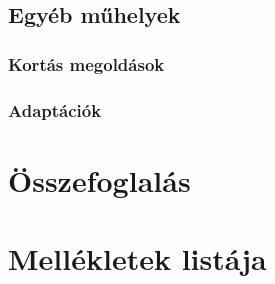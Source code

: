 \documentclass[fontsize=12pt, appendixprefix=true]{scrreprt}
\begin{document}
\section{Egyéb műhelyek}
\subsection{Kortás megoldások}
\subsection{Adaptációk}

\chapter{Összefoglalás} 


\printbibliography
\renewcommand{\appendixname}{Függelék}  %
\appendix
\chapter{Mellékletek listája}
\end{document}
